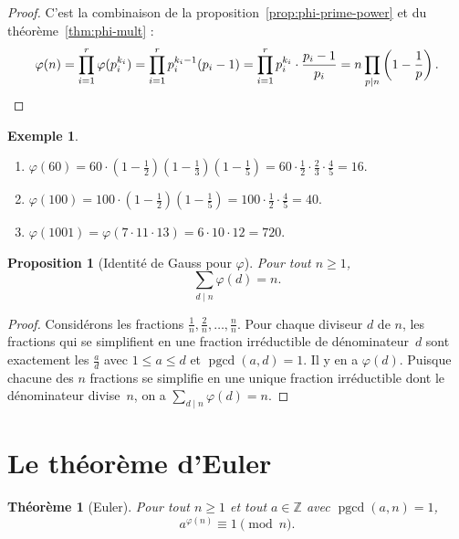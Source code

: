 \documentclass[12pt,a4paper,openany]{book}
\theoremstyle{definition}
\newtheorem{exemple}[definition]{Exemple}
\theoremstyle{plain}
\newtheorem{theoreme}[definition]{Théorème}
\newtheorem{proposition}[definition]{Proposition}
\theoremstyle{remark}
\newcommand{\Z}{\mathbb{Z}}
\DeclareMathOperator{\pgcd}{pgcd}
\begin{document}
\begin{proof}
C'est la combinaison de la proposition~\ref{prop:phi-prime-power} et du
théorème~\ref{thm:phi-mult} :
\[
  \varphi(n) = \prod_{i=1}^{r} \varphi(p_i^{k_i})
  = \prod_{i=1}^{r} p_i^{k_i-1}(p_i - 1)
  = \prod_{i=1}^{r} p_i^{k_i} \cdot \frac{p_i - 1}{p_i}
  = n \prod_{p \mid n} \left(1 - \frac{1}{p}\right).
  \qedhere
\]
\end{proof}

\begin{exemple}
\label{ex:phi-calculs}
\leavevmode
\begin{enumerate}[label=(\roman*)]
  \item $\varphi(60) = 60 \cdot \left(1 - \frac{1}{2}\right)\left(1 - \frac{1}{3}\right)
    \left(1 - \frac{1}{5}\right) = 60 \cdot \frac{1}{2} \cdot \frac{2}{3} \cdot
    \frac{4}{5} = 16$.
  \item $\varphi(100) = 100 \cdot \left(1 - \frac{1}{2}\right)\left(1 - \frac{1}{5}\right)
    = 100 \cdot \frac{1}{2} \cdot \frac{4}{5} = 40$.
  \item $\varphi(1001) = \varphi(7 \cdot 11 \cdot 13) = 6 \cdot 10 \cdot 12 = 720$.
\end{enumerate}
\end{exemple}

\begin{proposition}[Identité de Gauss pour $\varphi$]
\label{prop:gauss-phi}
Pour tout $n \geqslant 1$,
\[
  \sum_{d \mid n} \varphi(d) = n.
\]
\end{proposition}

\begin{proof}
Considérons les fractions $\frac{1}{n}, \frac{2}{n}, \ldots, \frac{n}{n}$.
Pour chaque diviseur $d$ de $n$, les fractions qui se simplifient en une fraction
irréductible de dénominateur~$d$ sont exactement les $\frac{a}{d}$ avec
$1 \leqslant a \leqslant d$ et $\pgcd(a, d) = 1$. Il y en a $\varphi(d)$.
Puisque chacune des $n$ fractions se simplifie en une unique fraction irréductible
dont le dénominateur divise~$n$, on a $\sum_{d \mid n} \varphi(d) = n$.
\end{proof}

\section{Le théorème d'Euler}
\label{sec:euler-thm}

\begin{theoreme}[Euler]
\label{thm:euler}
Pour tout $n \geqslant 1$ et tout $a \in \Z$ avec $\pgcd(a, n) = 1$,
\[
  a^{\varphi(n)} \equiv 1 \pmod{n}.
\]
\end{theoreme}
\end{document}
